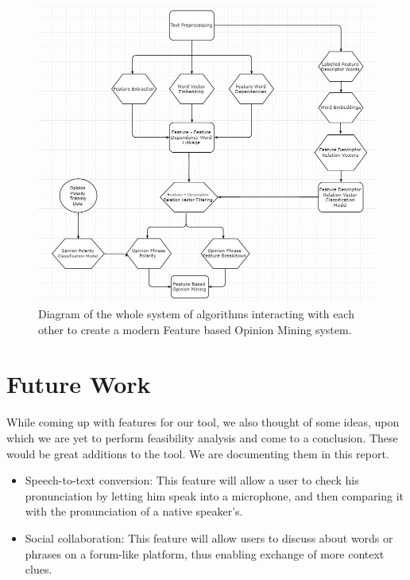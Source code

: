 \documentclass{sig-alternate}
\begin{document}
\begin{figure}
\centering
\includegraphics[scale=0.50]{images/full_technique.JPG}
\caption{Diagram of the whole system of algorithms interacting with each other to create a modern Feature based Opinion Mining system.}
\end{figure}



\section{Future Work}
While coming up with features for our tool, we also thought of some ideas, upon which we are yet to perform feasibility analysis and come to a conclusion. These would be great additions to the tool. We are documenting them in this report.
\begin{itemize}
\item Speech-to-text conversion: This feature will allow a user to check his pronunciation by letting him speak into a microphone, and then comparing it with the pronunciation of a native speaker's.
\item Social collaboration: This feature will allow users to discuss about words or phrases on a forum-like platform, thus enabling exchange of more context clues. 
\end{itemize}

%

%


%
%
\end{document}
